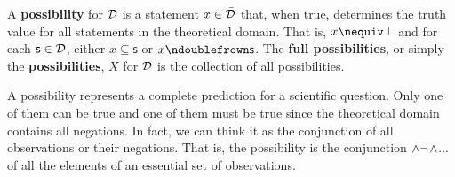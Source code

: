 \documentclass[11pt,letterpaper,fleqn]{memoir} %
\begin{document}
\begin{mathSection}

\begin{defn}
	A \textbf{possibility} for $\mathcal{D}$ is a statement $x \in \bar{\mathcal{D}}$ that, when true, determines the truth value for all statements in the theoretical domain. That is, $x \nequiv \contradiction$ and for each $\mathsf{s} \in \bar{\mathcal{D}}$, either $x \subseteq \mathsf{s}$ or $x \ncomp \mathsf{s}$. The \textbf{full possibilities}, or simply the \textbf{possibilities}, $X$ for $\mathcal{D}$ is the collection of all possibilities.
\end{defn}

\end{mathSection}

A possibility represents a complete prediction for a scientific question. Only one of them can be true and one of them must be true since the theoretical domain contains all negations. In fact, we can think it as the conjunction of all observations or their negations. That is, the possibility  is the conjunction $\wedge \neg$$\wedge$... of all the elements of an essential set of observations.
\end{document}
